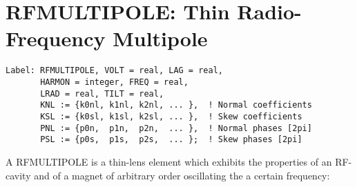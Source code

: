 
\section{RFMULTIPOLE: Thin Radio-Frequency Multipole}
\begin{verbatim}
Label: RFMULTIPOLE, VOLT = real, LAG = real,
       HARMON = integer, FREQ = real,
       LRAD = real, TILT = real,
       KNL := {k0nl, k1nl, k2nl, ... },  ! Normal coefficients
       KSL := {k0sl, k1sl, k2sl, ... },  ! Skew coefficients
       PNL := {p0n,  p1n,  p2n,  ... },  ! Normal phases [2pi]
       PSL := {p0s,  p1s,  p2s,  ... };  ! Skew phases [2pi]
\end{verbatim} 

A RFMULTIPOLE is a thin-lens element which exhibits the properties
of an RF-cavity and of a magnet of arbitrary order oscillating the
a certain frequency:        
 
